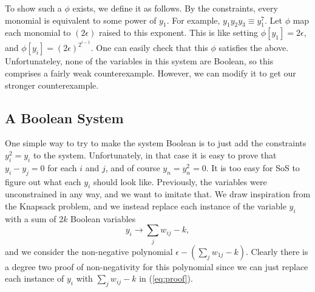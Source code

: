 To show such a $\phi$ exists, we define it as follows. By the constraints, every monomial is equivalent to some power of $y_1$. For example, $y_1y_2y_3 \equiv y_1^7$. Let $\phi$ map each monomial to $(2\epsilon)$ raised to this exponent. This is like setting $\phi[y_1] = 2\epsilon$, and $\phi[y_i] = (2\epsilon)^{2^{i-1}}$. One can easily check that this $\phi$ satisfies the above. Unfortunateley, none of the variables in this system are Boolean, so this comprises a fairly weak counterexample. However, we can modify it to get our stronger counterexample.
 
\subsection{A Boolean System}
One simple way to try to make the system Boolean is to just add the constraints $y_i^2 = y_i$ to the system. Unfortunately, in that case it is easy to prove that $y_i - y_j = 0$ for each $i$ and $j$, and of course $y_n = y_n^2 = 0$. It is too easy for SoS to figure out what each $y_i$ should look like. Previously, the variables were unconstrained in any way, and we want to imitate that. We draw inspiration from the Knapsack problem, and we instead replace each instance of the variable $y_i$ with a sum of $2k$ Boolean variables 
\[y_i \rightarrow \sum_j w_{ij} - k,\] 
and we consider the non-negative polynomial $\epsilon - (\sum_j w_{1j} - k)$. Clearly there is a degree two proof of non-negativity for this polynomial since we can just replace each instance of $y_i$ with $\sum_j w_{ij} - k$ in (\ref{eq:proof}). 


